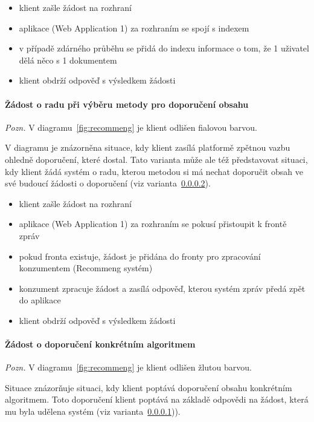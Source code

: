 \documentclass[thesis=M,czech]{FITthesis}[2014/05/07]
\begin{document}
\begin{itemize}
	\item klient zašle žádost na rozhraní
	\item aplikace (Web Application 1) za rozhraním se spojí s indexem
	\item v případě zdárného průběhu se přidá do indexu informace o tom, že 1 uživatel dělá něco s 1 dokumentem
	\item klient obdrží odpověď s výsledkem žádosti
\end{itemize}

\paragraph{Žádost o radu při výběru metody pro doporučení obsahu}
\label{subsub:purple}

\emph{Pozn.} V diagramu~\ref{fig:recommeng} je klient odlišen fialovou barvou.

V diagramu je znázorněna situace, kdy klient zasílá platformě zpětnou vazbu ohledně doporučení, které dostal. Tato varianta může ale též představovat situaci, kdy klient žádá systém o radu, kterou metodou si má nechat doporučit obsah ve své budoucí žádosti o doporučení (viz varianta~\ref{subsub:yellow}).

\begin{itemize}
	\item klient zašle žádost na rozhraní
	\item aplikace (Web Application 1) za rozhraním se pokusí přistoupit k frontě zpráv
	\item pokud fronta existuje, žádost je přidána do fronty pro zpracování konzumentem (Recommeng systém)
	\item konzument zpracuje žádost a zasílá odpověď, kterou systém zpráv předá zpět do aplikace
	\item klient obdrží odpověď s výsledkem žádosti
\end{itemize}

\paragraph{Žádost o doporučení konkrétním algoritmem}
\label{subsub:yellow}

\emph{Pozn.} V diagramu~\ref{fig:recommeng} je klient odlišen žlutou barvou.

Situace znázorňuje situaci, kdy klient poptává doporučení obsahu konkrétním algoritmem. Toto doporučení klient poptává na základě odpovědi na žádost, která mu byla udělena systém (viz varianta~\ref{subsub:purple})). 
\end{document}
